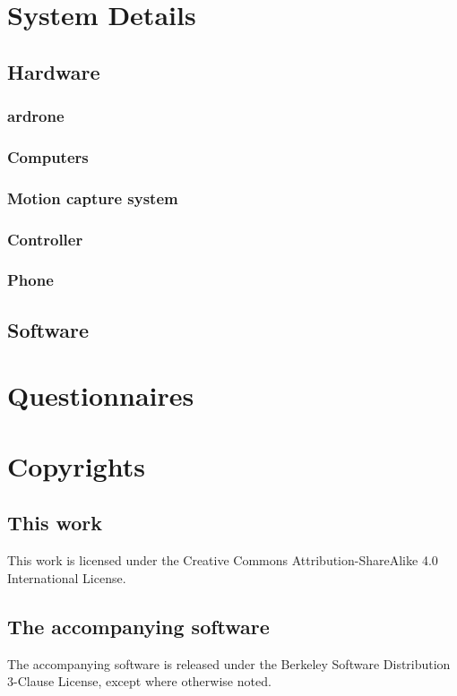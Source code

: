 \appendix
\chapter{System Details}
\section{Hardware}
  \subsection{\gls{ardrone}}
  \subsection{Computers}  %
  \subsection{Motion capture system}
  \subsection{Controller}
  \subsection{Phone}
\section{Software}

\chapter{Questionnaires}

\chapter{Copyrights}
\section{This work}
This work is licensed under the Creative Commons Attribution-ShareAlike 4.0 International License.
\section{The accompanying software}
The accompanying software is released under the Berkeley Software Distribution 3-Clause License, except where otherwise noted. 
